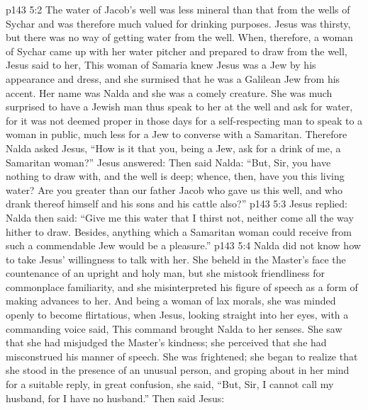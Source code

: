\vs p143 5:2 The water of Jacob’s well was less mineral than that from the wells of Sychar and was therefore much valued for drinking purposes. Jesus was thirsty, but there was no way of getting water from the well. When, therefore, a woman of Sychar came up with her water pitcher and prepared to draw from the well, Jesus said to her,  This woman of Samaria knew Jesus was a Jew by his appearance and dress, and she surmised that he was a Galilean Jew from his accent. Her name was Nalda and she was a comely creature. She was much surprised to have a Jewish man thus speak to her at the well and ask for water, for it was not deemed proper in those days for a self\hyp{}respecting man to speak to a woman in public, much less for a Jew to converse with a Samaritan. Therefore Nalda asked Jesus, “How is it that you, being a Jew, ask for a drink of me, a Samaritan woman?” Jesus answered:  Then said Nalda: “But, Sir, you have nothing to draw with, and the well is deep; whence, then, have you this living water? Are you greater than our father Jacob who gave us this well, and who drank thereof himself and his sons and his cattle also?”
\vs p143 5:3 Jesus replied:  Nalda then said: “Give me this water that I thirst not, neither come all the way hither to draw. Besides, anything which a Samaritan woman could receive from such a commendable Jew would be a pleasure.”
\vs p143 5:4 Nalda did not know how to take Jesus’ willingness to talk with her. She beheld in the Master’s face the countenance of an upright and holy man, but she mistook friendliness for commonplace familiarity, and she misinterpreted his figure of speech as a form of making advances to her. And being a woman of lax morals, she was minded openly to become flirtatious, when Jesus, looking straight into her eyes, with a commanding voice said,  This command brought Nalda to her senses. She saw that she had misjudged the Master’s kindness; she perceived that she had misconstrued his manner of speech. She was frightened; she began to realize that she stood in the presence of an unusual person, and groping about in her mind for a suitable reply, in great confusion, she said, “But, Sir, I cannot call my husband, for I have no husband.” Then said Jesus: 
